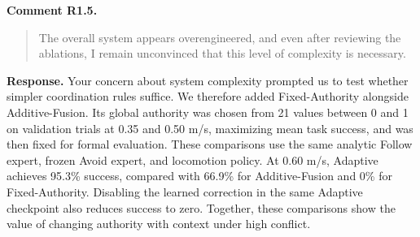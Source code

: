 \documentclass[letterpaper,11pt]{article}
\begin{document}
\noindent\textbf{Comment R1.5.}
\begin{quote}\color{reviewgray}
The overall system appears overengineered, and even after reviewing the ablations, I remain unconvinced that this level of complexity is necessary.
\end{quote}
\noindent\textbf{Response.}
Your concern about system complexity prompted us to test whether simpler coordination rules suffice. We therefore added Fixed-Authority alongside Additive-Fusion. Its global authority was chosen from 21 values between 0 and 1 on validation trials at 0.35 and 0.50 m/s, maximizing mean task success, and was then fixed for formal evaluation. These comparisons use the same analytic Follow expert, frozen Avoid expert, and locomotion policy. At 0.60 m/s, Adaptive achieves 95.3\% success, compared with 66.9\% for Additive-Fusion and 0\% for Fixed-Authority. Disabling the learned correction in the same Adaptive checkpoint also reduces success to zero. Together, these comparisons show the value of changing authority with context under high conflict.
\par\nopagebreak[4]


\end{document}
